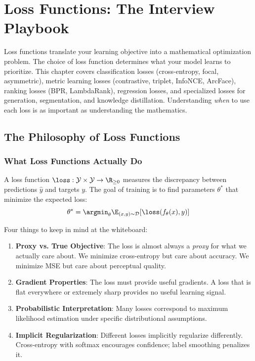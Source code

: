 \chapter{Loss Functions: The Interview Playbook}
\label{chap:loss_functions}

\begin{tldr}
Loss functions translate your learning objective into a mathematical optimization problem. The choice of loss function determines what your model learns to prioritize. This chapter covers classification losses (cross-entropy, focal, asymmetric), metric learning losses (contrastive, triplet, InfoNCE, ArcFace), ranking losses (BPR, LambdaRank), regression losses, and specialized losses for generation, segmentation, and knowledge distillation. Understanding \textit{when} to use each loss is as important as understanding the mathematics.
\end{tldr}

\section{The Philosophy of Loss Functions}
\label{sec:loss_philosophy}

\subsection{What Loss Functions Actually Do}

A loss function $\loss: \mathcal{Y} \times \mathcal{Y} \to \R_{\geq 0}$ measures the discrepancy between predictions $\hat{y}$ and targets $y$. The goal of training is to find parameters $\theta^*$ that minimize the expected loss:
\begin{equation}
\theta^* = \argmin_\theta \E_{(x,y) \sim \mathcal{D}}[\loss(f_\theta(x), y)]
\end{equation}

Four things to keep in mind at the whiteboard:

\begin{enumerate}
    \item \textbf{Proxy vs. True Objective}: The loss is almost always a \textit{proxy} for what we actually care about. We minimize cross-entropy but care about accuracy. We minimize MSE but care about perceptual quality.

    \item \textbf{Gradient Properties}: The loss must provide useful gradients. A loss that is flat everywhere or extremely sharp provides no useful learning signal.

    \item \textbf{Probabilistic Interpretation}: Many losses correspond to maximum likelihood estimation under specific distributional assumptions.

    \item \textbf{Implicit Regularization}: Different losses implicitly regularize differently. Cross-entropy with softmax encourages confidence; label smoothing penalizes it.
\end{enumerate}

